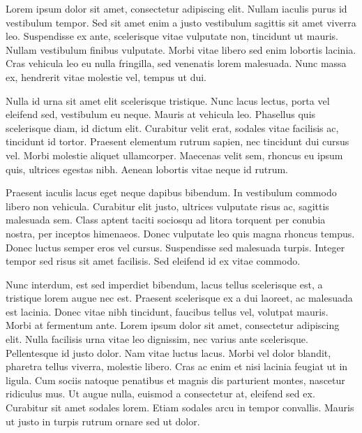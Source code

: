 \documentclass{letter-friggeri}
\begin{document}
 Lorem ipsum dolor sit amet, consectetur adipiscing elit. Nullam iaculis purus id vestibulum tempor. Sed sit amet enim a justo vestibulum sagittis sit amet viverra leo. Suspendisse ex ante, scelerisque vitae vulputate non, tincidunt ut mauris. Nullam vestibulum finibus vulputate. Morbi vitae libero sed enim lobortis lacinia. Cras vehicula leo eu nulla fringilla, sed venenatis lorem malesuada. Nunc massa ex, hendrerit vitae molestie vel, tempus ut dui.

Nulla id urna sit amet elit scelerisque tristique. Nunc lacus lectus, porta vel eleifend sed, vestibulum eu neque. Mauris at vehicula leo. Phasellus quis scelerisque diam, id dictum elit. Curabitur velit erat, sodales vitae facilisis ac, tincidunt id tortor. Praesent elementum rutrum sapien, nec tincidunt dui cursus vel. Morbi molestie aliquet ullamcorper. Maecenas velit sem, rhoncus eu ipsum quis, ultrices egestas nibh. Aenean lobortis vitae neque id rutrum.

Praesent iaculis lacus eget neque dapibus bibendum. In vestibulum commodo libero non vehicula. Curabitur elit justo, ultrices vulputate risus ac, sagittis malesuada sem. Class aptent taciti sociosqu ad litora torquent per conubia nostra, per inceptos himenaeos. Donec vulputate leo quis magna rhoncus tempus. Donec luctus semper eros vel cursus. Suspendisse sed malesuada turpis. Integer tempor sed risus sit amet facilisis. Sed eleifend id ex vitae commodo.

Nunc interdum, est sed imperdiet bibendum, lacus tellus scelerisque est, a tristique lorem augue nec est. Praesent scelerisque ex a dui laoreet, ac malesuada est lacinia. Donec vitae nibh tincidunt, faucibus tellus vel, volutpat mauris. Morbi at fermentum ante. Lorem ipsum dolor sit amet, consectetur adipiscing elit. Nulla facilisis urna vitae leo dignissim, nec varius ante scelerisque. Pellentesque id justo dolor. Nam vitae luctus lacus. Morbi vel dolor blandit, pharetra tellus viverra, molestie libero. Cras ac enim et nisi lacinia feugiat ut in ligula. Cum sociis natoque penatibus et magnis dis parturient montes, nascetur ridiculus mus. Ut augue nulla, euismod a consectetur at, eleifend sed ex. Curabitur sit amet sodales lorem. Etiam sodales arcu in tempor convallis. Mauris ut justo in turpis rutrum ornare sed ut dolor.
\end{document}
